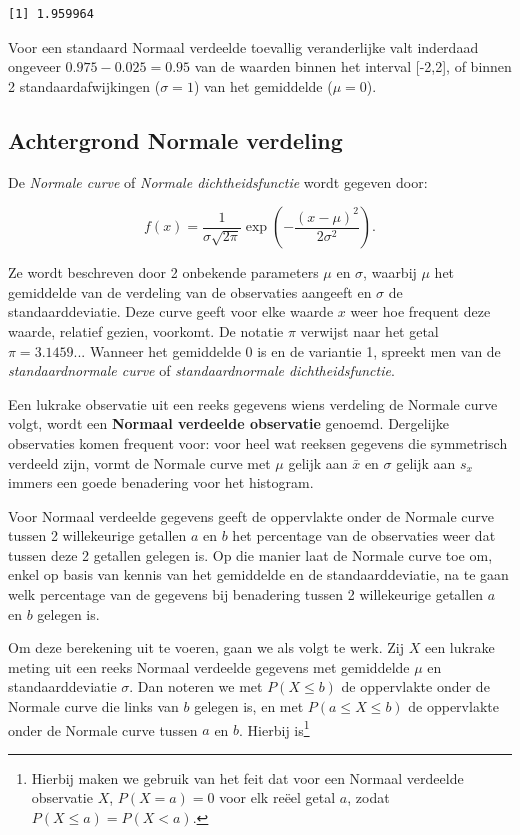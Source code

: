 \documentclass[
  dutch,
  letterpaper,
  12pt]{book}
\theoremstyle{definition}
\theoremstyle{definition}
\theoremstyle{definition}
\theoremstyle{remark}
\begin{document}
\begin{verbatim}
[1] 1.959964
\end{verbatim}

Voor een standaard Normaal verdeelde toevallig veranderlijke valt
inderdaad ongeveer \(0.975 - 0.025=0.95\) van de waarden binnen het
interval {[}-2,2{]}, of binnen 2 standaardafwijkingen (\(\sigma=1\)) van
het gemiddelde (\(\mu=0\)).

\subsection{Achtergrond Normale verdeling}\label{sec-normalcalc}

De \emph{Normale curve} of \emph{Normale dichtheidsfunctie} wordt
gegeven door:

\begin{equation*}
f(x) = \frac{1}{\sigma \sqrt{2 \pi} } \exp \left ( - \frac{ (x - \mu)^2 }{ 2
\sigma^2} \right ).
\end{equation*}

Ze wordt beschreven door 2 onbekende parameters \(\mu\) en \(\sigma\),
waarbij \(\mu\) het gemiddelde van de verdeling van de observaties
aangeeft en \(\sigma\) de standaarddeviatie. Deze curve geeft voor elke
waarde \(x\) weer hoe frequent deze waarde, relatief gezien, voorkomt.
De notatie \(\pi\) verwijst naar het getal \(\pi=3.1459...\) Wanneer het
gemiddelde 0 is en de variantie 1, spreekt men van de
\emph{standaardnormale curve} of \emph{standaardnormale
dichtheidsfunctie}.

Een lukrake observatie uit een reeks gegevens wiens verdeling de Normale
curve volgt, wordt een \textbf{Normaal verdeelde observatie} genoemd.
Dergelijke observaties komen frequent voor: voor heel wat reeksen
gegevens die symmetrisch verdeeld zijn, vormt de Normale curve met
\(\mu\) gelijk aan \(\bar x\) en \(\sigma\) gelijk aan \(s_x\) immers
een goede benadering voor het histogram.

Voor Normaal verdeelde gegevens geeft de oppervlakte onder de Normale
curve tussen 2 willekeurige getallen \(a\) en \(b\) het percentage van
de observaties weer dat tussen deze 2 getallen gelegen is. Op die manier
laat de Normale curve toe om, enkel op basis van kennis van het
gemiddelde en de standaarddeviatie, na te gaan welk percentage van de
gegevens bij benadering tussen 2 willekeurige getallen \(a\) en \(b\)
gelegen is.

Om deze berekening uit te voeren, gaan we als volgt te werk. Zij \(X\)
een lukrake meting uit een reeks Normaal verdeelde gegevens met
gemiddelde \(\mu\) en standaarddeviatie \(\sigma\). Dan noteren we met
\(P(X\leq b)\) de oppervlakte onder de Normale curve die links van \(b\)
gelegen is, en met \(P(a\leq X\leq b)\) de oppervlakte onder de Normale
curve tussen \(a\) en \(b\). Hierbij is\footnote{Hierbij maken we
  gebruik van het feit dat voor een Normaal verdeelde observatie \(X\),
  \(P(X=a)=0\) voor elk reëel getal \(a\), zodat \(P(X\leq a)=P(X<a)\).}
\end{document}

